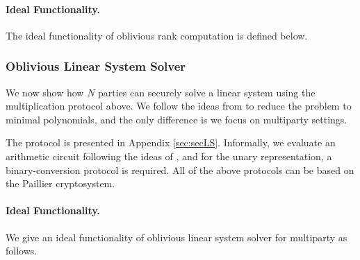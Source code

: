  \paragraph{Ideal Functionality.} The ideal functionality of oblivious rank computation is defined below. 
 \begin{center}
\end{center}


\subsubsection{Oblivious Linear System Solver}
We now show how $N$ parties can securely solve a linear system using the multiplication protocol above. We follow the ideas from \cite{TCC:KMWF07} to reduce the problem to minimal polynomials, and the only difference is we focus on multiparty settings.
 
The protocol is presented in Appendix \ref{sec:secLS}.
Informally, we evaluate an arithmetic circuit following the ideas of \cite{EC:CraDamNie01}, and for the unary representation, a binary-conversion protocol \cite{EC:SchTuy06} is required. All of the above protocols can be based on the Paillier cryptosystem. 


 \paragraph{Ideal Functionality.} We give an ideal functionality of oblivious linear system solver for multiparty as follows.
 
